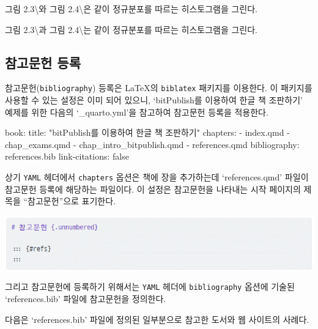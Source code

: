 \documentclass[
  letterpaper,
]{book}
\newenvironment{Shaded}{\begin{snugshade}}{\end{snugshade}}
\newcommand{\ExtensionTok}[1]{\textcolor[rgb]{0.00,0.23,0.31}{#1}}
\newcommand{\NormalTok}[1]{\textcolor[rgb]{0.00,0.23,0.31}{#1}}
\newcommand{\StringTok}[1]{\textcolor[rgb]{0.13,0.47,0.30}{#1}}
\begin{document}
그림 2.3\textbackslash 와 그림 2.4\textbackslash 은 같이 정규분포를
따르는 히스토그램을 그린다.

그림 2.3\textbackslash 과 그림 2.4\textbackslash 는 같이 정규분포를
따르는 히스토그램을 그린다.

\hypertarget{uxcc38uxace0uxbb38uxd5cc-uxb4f1uxb85d}{%
\subsection{참고문헌 등록}\label{uxcc38uxace0uxbb38uxd5cc-uxb4f1uxb85d}}

참고문헌(\texttt{bibliography})
등록은 LaTeX의 \texttt{biblatex} 패키지를 이용한다. 이
패키지를 사용할 수 있는 설정은 이미 되어 있으니, `bitPublish를 이용하여
한글 책 조판하기' 예제를 위한 다음의 `\_quarto.yml'을 참고하여 참고문헌
등록을 적용한다.

\begin{Shaded}
\begin{Highlighting}[]
\ExtensionTok{book:}
  \ExtensionTok{title:} \StringTok{"bitPublish를 이용하여 한글 책 조판하기"}
  \ExtensionTok{chapters:}
    \ExtensionTok{{-}}\NormalTok{ index.qmd}
    \ExtensionTok{{-}}\NormalTok{ chap\_exams.qmd}
    \ExtensionTok{{-}}\NormalTok{ chap\_intro\_bitpublish.qmd}
    \ExtensionTok{{-}}\NormalTok{ references.qmd}
\ExtensionTok{bibliography:}\NormalTok{ references.bib}
\ExtensionTok{link{-}citations:}\NormalTok{ false}
\end{Highlighting}
\end{Shaded}

상기 \texttt{YAML} 헤더에서 \texttt{chapters} 옵션은 책에 장을
추가하는데 `references.qmd' 파일이 참고문헌 등록에 해당하는 파일이다. 이
설정은 참고문헌을 나타내는 시작 페이지의 제목을 ``참고문헌''으로
표기한다.

\includegraphics{images/quarto_reference.png}

그리고 참고문헌에 등록하기 위해서는 \texttt{YAML} 헤더에
\texttt{bibliography} 옵션에 기술된 `references.bib' 파일에 참고문헌을
정의한다.

다음은 `references.bib' 파일에 정의된 일부분으로 참고한 도서와 웹
사이트의 사례다.
\end{document}
